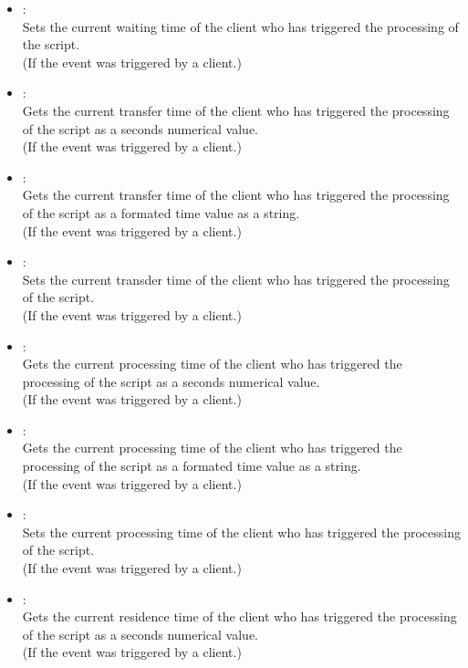 \begin{itemize}
\item
{}:\\
Sets the current waiting time of the client who has triggered the processing of the script.\\
(If the event was triggered by a client.)

\item
{}:\\
Gets the current transfer time of the client who has triggered the processing of the script as a seconds numerical value.\\
(If the event was triggered by a client.)

\item
{}:\\
Gets the current transfer time of the client who has triggered the processing of the script as a formated time value as a string.\\
(If the event was triggered by a client.)

\item
{}:\\
Sets the current transder time of the client who has triggered the processing of the script.\\
(If the event was triggered by a client.)

\item
{}:\\
Gets the current processing time of the client who has triggered the processing of the script as a seconds numerical value.\\
(If the event was triggered by a client.)

\item
{}:\\
Gets the current processing time of the client who has triggered the processing of the script as a formated time value as a string.\\
(If the event was triggered by a client.)

\item
{}:\\
Sets the current processing time of the client who has triggered the processing of the script.\\
(If the event was triggered by a client.)

\item
{}:\\
Gets the current residence time of the client who has triggered the processing of the script as a seconds numerical value.\\
(If the event was triggered by a client.)


\end{itemize}
